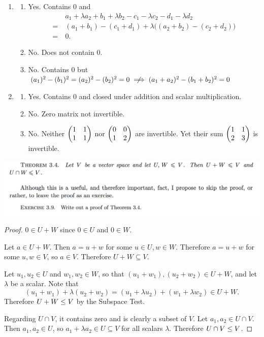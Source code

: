 \documentclass[12pt]{article}
\begin{document}
\begin{enumerate}[label=(\alph*)]
\item
  \begin{enumerate}[label=(\roman*)]
  \item Yes. Contains $0$ and
    \begin{align*}
      &a_1 + \lambda a_2 + b_1 + \lambda b_2 - c_1 - \lambda c_2 - d_1 - \lambda d_2\\
      =~&(a_1 + b_1) - (c_1 + d_1) + \lambda\Big((a_2 + b_2) - (c_2 + d_2)\Big)\\
      =~&0.
    \end{align*}
  \item No. Does not contain 0.
  \item No. Contains 0 but $(a_1)^2 - (b_1)^2 = (a_2)^2 - (b_2)^2 = 0 \nimplies (a_1 + a_2)^2 - (b_1 + b_2)^2 = 0$
  \end{enumerate}
\item
  \begin{enumerate}[label=(\roman*)]
  \item Yes. Contains 0 and closed under addition and scalar multiplication.
  \item No. Zero matrix not invertible.
  \item No. Neither $\begin{pmatrix}1 & 1\\1 & 1\\ \end{pmatrix}$ nor $\begin{pmatrix}0 & 0\\1 & 2\\ \end{pmatrix}$ are invertible.
        Yet their sum $\begin{pmatrix}1 & 1\\2 & 3\\ \end{pmatrix}$ is invertible.
  \end{enumerate}
\end{enumerate}

\begin{mdframed}
\includegraphics[width=400pt]{img/oxford-prelims-M1-linear-algebra-3-9.png}
\end{mdframed}

\begin{proof}
  $0 \in U + W$ since $0 \in U$ and $0 \in W$.

  Let $a \in U + W$. Then $a = u + w$ for some $u \in U, w \in W$. Therefore
  $a = u + w$ for some $u, w \in V$, so $a \in V$. Therefore
  $U + W \subseteq V$.

  Let $u_1, u_2 \in U$ and $w_1, w_2 \in W$, so that
  $(u_1 + w_1), (u_2 + w_2) \in U + W$, and let $\lambda$ be a scalar. Note
  that
  $$
  (u_1 + w_1) + \lambda(u_2 + w_2) = (u_1 + \lambda u_2) + (w_1 + \lambda w_2) \in U + W.
  $$
  Therefore $U + W \leq V$ by the Subspace Test.

  Regarding $U \cap V$, it contains zero and is clearly a subset of $V$. Let
  $a_1, a_2 \in U \cap V$. Then $a_1, a_2 \in U$, so
  $a_1 + \lambda a_2 \in U \subseteq V$ for all scalars $\lambda$. Therefore
  $U \cap V \leq V$.
\end{proof}
\end{document}
